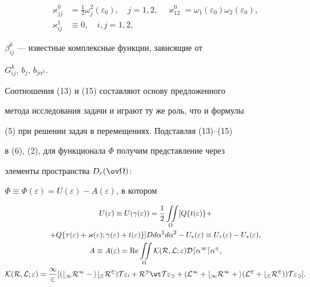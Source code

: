 \begin{equation} 


\begin{split} 


\varkappa^0_{jj}&=\frac{1}{2}\omega^2_j(\varepsilon_0), 


\quad j=1,2,\quad \varkappa^0_{12}= 


\omega_1(\varepsilon_0)\omega_2(\varepsilon_0),\\ 


% 


\varkappa^1_{i j}&\equiv 0,\quad i,j=1,2, 


\end{split} 


\end{equation} 


$\beta^k_{i j}$ --- известные комплексные функции, зависящие от 


$G^k_{ij}$, $b_j$, $b_{j\alpha^k}$. 


 


Соотношения (13) и (15) составляют основу предложенного 


метода исследования задачи и играют ту же роль, что и формулы 


(5) при решении задач в перемещениях. Подставляя (13)--(15) 


в (6), (2), для функционала $\Phi$ получим представление через 


элементы пространства $D_\varepsilon(\ov\Omega)$: 


$\Phi\equiv\Phi(\varepsilon)=U(\varepsilon)-A(\varepsilon)$, в котором 


\begin{gather} 


U(\varepsilon)\equiv U(\gamma(\varepsilon))=\frac{1}{2} 


\iint\limits_\Omega [Q\{t(\varepsilon)\}+ \notag \\ 


% 


+Q\{\tau(\varepsilon)+\varkappa(\varepsilon); 


\gamma(\varepsilon)+t(\varepsilon)\}] D d\alpha^1 d\alpha^2- 


U_*(\varepsilon)\equiv U_\tau(\varepsilon)- 


U_*(\varepsilon), \\ 


A\equiv A(\varepsilon)=\re\iint\limits_\Omega 


\cal K(\cal R,\cal L;\varepsilon)D d\alpha^1 d\alpha^2, \\ 


% 


\cal K(\cal R,\cal L;\varepsilon)=\frac{1}{2}[(b_1\cal R^1- 


i b_2\cal R^2)T\varepsilon_0+\cal R^3\wt T\varepsilon_3+ 


(\cal L^1+b_1\cal R^1+i(\cal L^2+b_2\cal R^2)) 


T\varepsilon_3]. \notag


\end{gather} 



